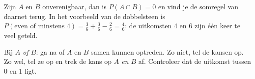Zijn $A$ en $B$ onverenigbaar, dan is $P(A \cap B) = 0$ en vind je de somregel van daarnet terug. In het voorbeeld van de dobbelsteen is $P(\text{even of minstens 4}) = \frac36 + \frac36 - \frac26 = \frac46$: de uitkomsten 4 en 6 zijn één keer te veel geteld.


\begin{werkwijze}
Bij \textit{$A$ of $B$}: ga na of $A$ en $B$ samen kunnen optreden. Zo niet, tel de kansen op. Zo wel, tel ze op en trek de kans op \textit{$A$ en $B$} af. Controleer dat de uitkomst tussen 0 en 1 ligt.
\end{werkwijze}

\begin{oefeningen}

\end{oefeningen}

\opdrachtenkop

